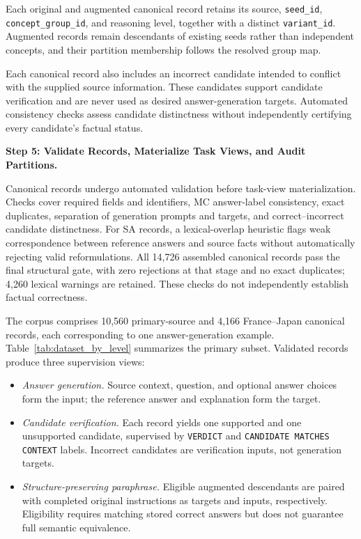 \documentclass[a4paper,fleqn]{cas-sc}
\begin{document}
Each original and augmented canonical record retains its source, \texttt{seed\_id}, \texttt{concept\_group\_id}, and reasoning level, together with a distinct \texttt{variant\_id}. Augmented records remain descendants of existing seeds rather than independent concepts, and their partition membership follows the resolved group map.

Each canonical record also includes an incorrect candidate intended to conflict with the supplied source information. These candidates support candidate verification and are never used as desired answer-generation targets. Automated consistency checks assess candidate distinctness without independently certifying every candidate's factual status.

\medskip
\noindent\textbf{Step 5: Validate Records, Materialize Task Views, and Audit Partitions.}

Canonical records undergo automated validation before task-view materialization. Checks cover required fields and identifiers, MC answer-label consistency, exact duplicates, separation of generation prompts and targets, and correct--incorrect candidate distinctness. For SA records, a lexical-overlap heuristic flags weak correspondence between reference answers and source facts without automatically rejecting valid reformulations. All 14,726 assembled canonical records pass the final structural gate, with zero rejections at that stage and no exact duplicates; 4,260 lexical warnings are retained. These checks do not independently establish factual correctness.

The corpus comprises 10,560 primary-source and 4,166 France--Japan canonical records, each corresponding to one answer-generation example. Table~\ref{tab:dataset_by_level} summarizes the primary subset. Validated records produce three supervision views:

\begin{itemize}
    \item \textit{Answer generation.}
    Source context, question, and optional answer choices form the input; the reference answer and explanation form the target.

    \item \textit{Candidate verification.}
    Each record yields one supported and one unsupported candidate, supervised by \texttt{VERDICT} and \texttt{CANDIDATE MATCHES CONTEXT} labels. Incorrect candidates are verification inputs, not generation targets.

    \item \textit{Structure-preserving paraphrase.}
    Eligible augmented descendants are paired with completed original instructions as targets and inputs, respectively. Eligibility requires matching stored correct answers but does not guarantee full semantic equivalence.
\end{itemize}
\end{document}
